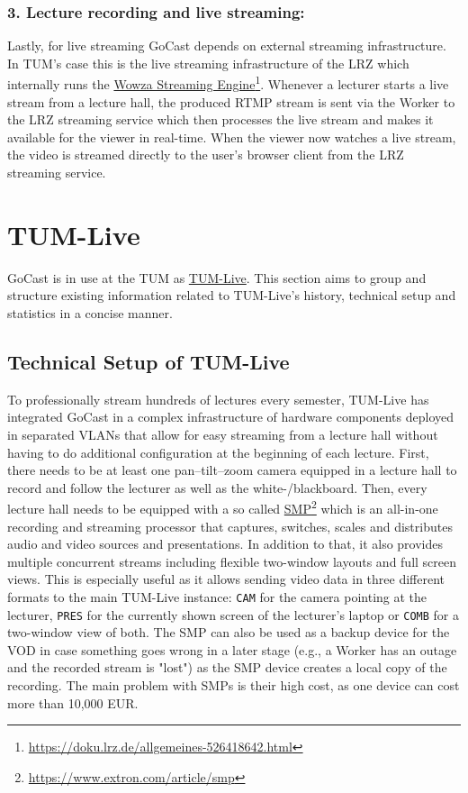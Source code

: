 \subsubsection{3. Lecture recording and live streaming:}
Lastly, for live streaming GoCast depends on external streaming infrastructure. In \ac{TUM}'s case this is the live streaming infrastructure of the \ac{LRZ} which internally runs the \href{https://doku.lrz.de/allgemeines-526418642.html}{Wowza Streaming Engine}\footnote{\url{https://doku.lrz.de/allgemeines-526418642.html}}. Whenever a lecturer starts a live stream from a lecture hall, the produced \ac{RTMP} stream is sent via the Worker to the \ac{LRZ} streaming service which then processes the live stream and makes it available for the viewer in real-time. When the viewer now watches a live stream, the video is streamed directly to the user's browser client from the \ac{LRZ} streaming service. 

\section{TUM-Live}\label{section:tum-live-history}

GoCast is in use at the \ac{TUM} as \href{https://tum.live}{TUM-Live}. This section aims to group and structure existing information related to TUM-Live's history, technical setup and statistics in a concise manner. 

\subsection{Technical Setup of TUM-Live}

To professionally stream hundreds of lectures every semester, TUM-Live has integrated GoCast in a complex infrastructure of hardware components deployed in separated VLANs that allow for easy streaming from a lecture hall without having to do additional configuration at the beginning of each lecture. 
First, there needs to be at least one pan–tilt–zoom camera equipped in a lecture hall to record and follow the lecturer as well as the white-/blackboard.
Then, every lecture hall needs to be equipped with a so called \href{https://www.extron.com/article/smp}{\ac{SMP}}\footnote{\url{https://www.extron.com/article/smp}} which is an all-in-one recording and streaming processor that captures, switches, scales and distributes audio and video sources and presentations. In addition to that, it also provides multiple concurrent streams including flexible two-window layouts and full screen views. This is especially useful as it allows sending video data in three different formats to the main TUM-Live instance: \texttt{CAM} for the camera pointing at the lecturer, \texttt{PRES} for the currently shown screen of the lecturer's laptop or \texttt{COMB} for a two-window view of both. The \ac{SMP} can also be used as a backup device for the \ac{VOD} in case something goes wrong in a later stage (e.g., a Worker has an outage and the recorded stream is "lost") as the \ac{SMP} device creates a local copy of the recording. The main problem with \ac{SMP}s is their high cost, as one device can cost more than 10,000 EUR.

